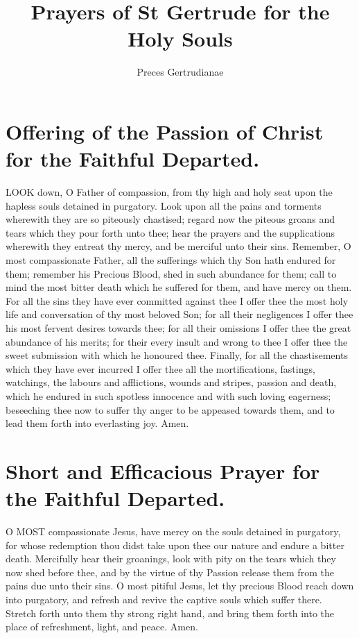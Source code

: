 \documentclass[a5paper,12pt]{memoir}
\title{Prayers of St Gertrude for the Holy Souls}
\author{Preces Gertrudianae}
\begin{document}
\maketitle

\section{Offering of the Passion of Christ for the Faithful Departed.}

LOOK down, O Father of compassion, from thy high and 
holy seat upon the hapless souls detained in 
purgatory. Look upon all the pains and torments wherewith they 
are so piteously chastised; regard now the 
piteous groans and 
tears which they pour 
forth unto thee; hear 
the prayers and the 
supplications wherewith they entreat thy 
mercy, and be merciful unto their sins. Remember, O most compassionate Father, all 
the sufferings which 
thy Son hath endured 
for them; remember 
his Precious Blood, shed 
in such abundance 
for them; call to mind 
the most bitter death 
which he suffered for 
them, and have mercy on them. For all 
the sins they have ever committed against 
thee I offer thee the 
most holy life and conversation of thy most 
beloved Son; for all 
their negligences I offer thee his most fervent desires towards 
thee; for all their 
omissions I offer thee 
the great abundance 
of his merits; for their 
every insult and wrong 
to thee I offer thee 
the sweet submission 
with which he honoured thee. Finally, 
for all the chastisements which they have 
ever incurred I offer 
thee all the mortifications, fastings, watchings, the labours and 
afflictions, wounds and 
stripes, passion and 
death, which he endured in such spotless innocence and 
with such loving eagerness; beseeching 
thee now to suffer thy 
anger to be appeased 
towards them, and to 
lead them forth into 
everlasting joy. Amen. 

\section{Short and Efficacious Prayer for the Faithful Departed.}

O MOST compassionate Jesus, 
have mercy on the 
souls detained in purgatory, for whose redemption thou didst 
take upon thee our 
nature and endure a 
bitter death. Mercifully hear their groanings, look with pity 
on the tears which 
they now shed before 
thee, and by the virtue of thy Passion release them from the 
pains due unto their 
sins. O most pitiful 
Jesus, let thy precious 
Blood reach down into purgatory, and refresh and revive the 
captive souls which 
suffer there. Stretch forth unto them thy 
strong right hand, 
and bring them forth 
into the place of refreshment, light, and 
peace. Amen. 
\end{document}
